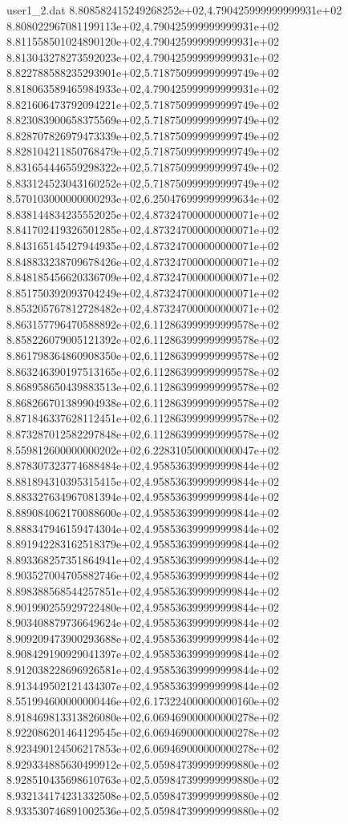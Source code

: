 \begin{filecontents}{user1_2.dat}
8.808582415249268252e+02,4.790425999999999931e+02
8.808022967081199113e+02,4.790425999999999931e+02
8.811558501024890120e+02,4.790425999999999931e+02
8.813043278273592023e+02,4.790425999999999931e+02
8.822788588235293901e+02,5.718750999999999749e+02
8.818063589465984933e+02,4.790425999999999931e+02
8.821606473792094221e+02,5.718750999999999749e+02
8.823083900658375569e+02,5.718750999999999749e+02
8.828707826979473339e+02,5.718750999999999749e+02
8.828104211850768479e+02,5.718750999999999749e+02
8.831654446559298322e+02,5.718750999999999749e+02
8.833124523043160252e+02,5.718750999999999749e+02
8.570103000000000293e+02,6.250476999999999634e+02
8.838144834235552025e+02,4.873247000000000071e+02
8.841702419326501285e+02,4.873247000000000071e+02
8.843165145427944935e+02,4.873247000000000071e+02
8.848833238709678426e+02,4.873247000000000071e+02
8.848185456620336709e+02,4.873247000000000071e+02
8.851750392093704249e+02,4.873247000000000071e+02
8.853205767812728482e+02,4.873247000000000071e+02
8.863157796470588892e+02,6.112863999999999578e+02
8.858226079005121392e+02,6.112863999999999578e+02
8.861798364860908350e+02,6.112863999999999578e+02
8.863246390197513165e+02,6.112863999999999578e+02
8.868958650439883513e+02,6.112863999999999578e+02
8.868266701389904938e+02,6.112863999999999578e+02
8.871846337628112451e+02,6.112863999999999578e+02
8.873287012582297848e+02,6.112863999999999578e+02
8.559812600000000202e+02,6.228310500000000047e+02
8.878307323774688484e+02,4.958536399999999844e+02
8.881894310395315415e+02,4.958536399999999844e+02
8.883327634967081394e+02,4.958536399999999844e+02
8.889084062170088600e+02,4.958536399999999844e+02
8.888347946159474304e+02,4.958536399999999844e+02
8.891942283162518379e+02,4.958536399999999844e+02
8.893368257351864941e+02,4.958536399999999844e+02
8.903527004705882746e+02,4.958536399999999844e+02
8.898388568544257851e+02,4.958536399999999844e+02
8.901990255929722480e+02,4.958536399999999844e+02
8.903408879736649624e+02,4.958536399999999844e+02
8.909209473900293688e+02,4.958536399999999844e+02
8.908429190929041397e+02,4.958536399999999844e+02
8.912038228696926581e+02,4.958536399999999844e+02
8.913449502121434307e+02,4.958536399999999844e+02
8.551994600000000446e+02,6.173224000000000160e+02
8.918469813313826080e+02,6.069469000000000278e+02
8.922086201464129545e+02,6.069469000000000278e+02
8.923490124506217853e+02,6.069469000000000278e+02
8.929334885630499912e+02,5.059847399999999880e+02
8.928510435698610763e+02,5.059847399999999880e+02
8.932134174231332508e+02,5.059847399999999880e+02
8.933530746891002536e+02,5.059847399999999880e+02

\end{filecontents}
